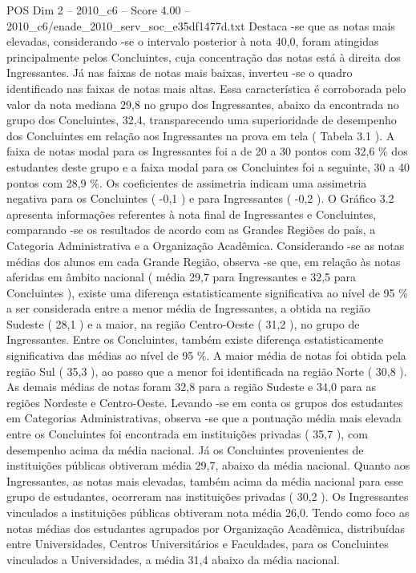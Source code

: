 \begin{textsample}{POS Dim 2 – 2010\_c6 – Score 4.00 – 2010\_c6/enade\_2010\_serv\_soc\_e35df1477d.txt}
Destaca -se que as notas mais elevadas, considerando -se o intervalo posterior à nota 40,0, foram atingidas principalmente pelos Concluintes, cuja concentração das notas está à direita dos Ingressantes.
Já nas faixas de notas mais baixas, inverteu -se o quadro identificado nas faixas de notas mais altas.
Essa característica é corroborada pelo valor da nota mediana 29,8 no grupo dos Ingressantes, abaixo da encontrada no grupo dos Concluintes, 32,4, transparecendo uma superioridade de desempenho dos Concluintes em relação aos Ingressantes na prova em tela ( Tabela 3.1 ).
A faixa de notas modal para os Ingressantes foi a de 20 a 30 pontos com 32,6 \% dos estudantes deste grupo e a faixa modal para os Concluintes foi a seguinte, 30 a 40 pontos com 28,9 \%.
Os coeficientes de assimetria indicam uma assimetria negativa para os Concluintes ( -0,1 ) e para Ingressantes ( -0,2 ).
O Gráfico 3.2 apresenta informações referentes à nota final de Ingressantes e Concluintes, comparando -se os resultados de acordo com as Grandes Regiões do país, a Categoria Administrativa e a Organização Acadêmica.
Considerando -se as notas médias dos alunos em cada Grande Região, observa -se que, em relação às notas aferidas em âmbito nacional ( média 29,7 para Ingressantes e 32,5 para Concluintes ), existe uma diferença estatisticamente significativa ao nível de 95 \% a ser considerada entre a menor média de Ingressantes, a obtida na região Sudeste ( 28,1 ) e a maior, na região Centro-Oeste ( 31,2 ), no grupo de Ingressantes.
Entre os Concluintes, também existe diferença estatisticamente significativa das médias ao nível de 95 \%.
A maior média de notas foi obtida pela região Sul ( 35,3 ), ao passo que a menor foi identificada na região Norte ( 30,8 ).
As demais médias de notas foram 32,8 para a região Sudeste e 34,0 para as regiões Nordeste e Centro-Oeste.
Levando -se em conta os grupos dos estudantes em Categorias Administrativas, observa -se que a pontuação média mais elevada entre os Concluintes foi encontrada em instituições privadas ( 35,7 ), com desempenho acima da média nacional.
Já os Concluintes provenientes de instituições públicas obtiveram média 29,7, abaixo da média nacional.
Quanto aos Ingressantes, as notas mais elevadas, também acima da média nacional para esse grupo de estudantes, ocorreram nas instituições privadas ( 30,2 ).
Os Ingressantes vinculados a instituições públicas obtiveram nota média 26,0.
Tendo como foco as notas médias dos estudantes agrupados por Organização Acadêmica, distribuídas entre Universidades, Centros Universitários e Faculdades, para os Concluintes vinculados a Universidades, a média 31,4 abaixo da média nacional.

\end{textsample}
